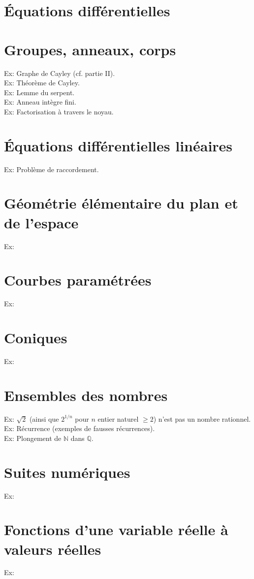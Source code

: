 \documentclass{article}
\begin{document}
\section{\'Equations diff\'erentielles}


\section{Groupes, anneaux, corps}
Ex: Graphe de Cayley (cf. partie II).\\
Ex: Th\'eor\`eme de Cayley.\\
Ex: Lemme du serpent.\\
Ex: Anneau int\`egre fini.\\
Ex: Factorisation \`a travers le noyau.
\section{\'Equations diff\'erentielles lin\'eaires}
Ex: Probl\`eme de raccordement.
\section{G\'eom\'etrie \'el\'ementaire du plan et de l'espace}
Ex:
\section{Courbes param\'etr\'ees}
Ex:
\section{Coniques}
Ex:
\section{Ensembles des nombres}
Ex: $\sqrt{2}$ (ainsi que $2^{1/n}$ pour $n$ entier naturel $\geq 2$) n'est pas un nombre rationnel.\\
Ex: R\'ecurrence (exemples de fausses r\'ecurrences).\\
Ex: Plongement de $\mathbb{N}$ dans $\mathbb{Q}$.
\section{Suites num\'eriques}
Ex:
\section{Fonctions d'une variable r\'eelle \`a valeurs r\'eelles}
Ex:
\end{document}
